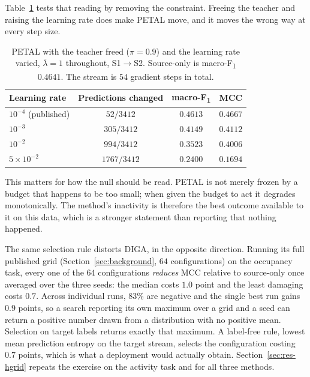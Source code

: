\documentclass[a4paper,fleqn]{cas-dc}
\newcommand{\macf}{macro-F\textsubscript{1}}
\begin{document}
Table~\ref{tab:petal-budget} tests that reading by removing the constraint. Freeing the
teacher and raising the learning rate does make PETAL move, and it moves the wrong way at
every step size.

\begin{table}[t]
\centering
\caption{PETAL with the teacher freed ($\pi=0.9$) and the learning rate varied,
$\bar\lambda=1$ throughout, S1$\to$S2. Source-only is \macf{} $0.4641$. The stream is $54$
gradient steps in total.}
\label{tab:petal-budget}
\small
\begin{tabular}{@{}lccc@{}}
\toprule
Learning rate & Predictions changed & \macf & MCC \\
\midrule
$10^{-4}$ (published) & $52/3412$   & $0.4613$ & $0.4667$ \\
$10^{-3}$             & $305/3412$  & $0.4149$ & $0.4112$ \\
$10^{-2}$             & $994/3412$  & $0.3523$ & $0.4006$ \\
$5\times10^{-2}$      & $1767/3412$ & $0.2400$ & $0.1694$ \\
\bottomrule
\end{tabular}
\end{table}

This matters for how the null should be read. PETAL is not merely frozen by a budget that
happens to be too small; when given the budget to act it degrades monotonically. The
method's inactivity is therefore the best outcome available to it on this data, which is a
stronger statement than reporting that nothing happened.

The same selection rule distorts DIGA, in the opposite direction. Running its full
published grid (Section~\ref{sec:background}, $64$ configurations) on the occupancy task,
every one of the $64$ configurations \emph{reduces} MCC relative to source-only once
averaged over the three seeds: the median costs $1.0$ point and the least damaging costs
$0.7$. Across individual runs, $83\%$ are negative and the single best run gains
$0.9$ points, so a search reporting its own maximum over a grid and a seed can return a
positive number drawn from a distribution with no positive mean. Selection on target
labels returns exactly that maximum. A label-free rule, lowest mean prediction entropy
on the target stream, selects the configuration costing $0.7$ points, which is what a
deployment would actually obtain. Section~\ref{sec:res-hgrid} repeats the exercise on the
activity task and for all three methods.
\end{document}
